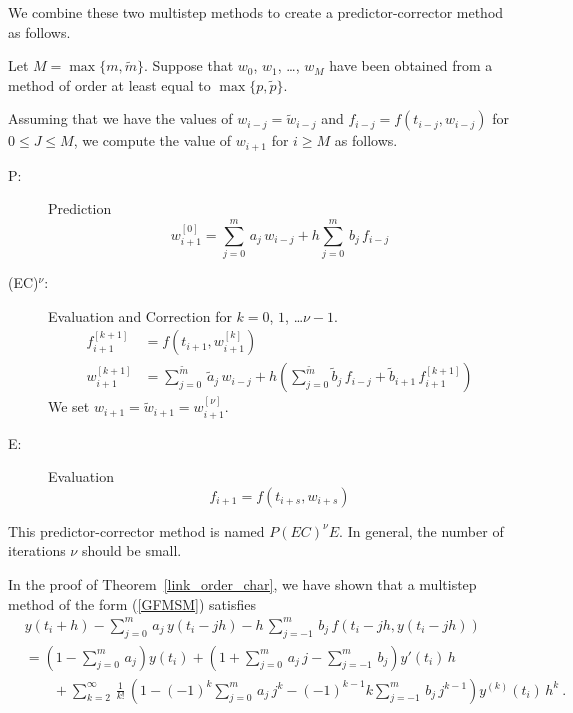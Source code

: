 We combine these two multistep methods to create a predictor-corrector
method as follows.

Let $M = \max\{m,\tilde{m}\}$.  Suppose that $w_0$, $w_1$, \ldots,
$w_M$ have been obtained from a method of order at least equal to
$\max\{p,\tilde{p}\}$.

Assuming that we have the values of $w_{i-j} = \tilde{w}_{i-j}$ and
$f_{i-j} = f(t_{i-j},w_{i-j})$ for $0\leq J \leq M$, we compute the value of
$w_{i+1}$ for $i\geq M$ as
follows.
\begin{description}
\item[P:] Prediction
\begin{equation} \label{Pred0}
w_{i+1}^{[0]} = \sum_{j=0}^m\,a_j\,w_{i-j} + h \sum_{j=0}^m\,b_j\,f_{i-j}
\end{equation}
\item[(EC)$^{\nu}$:] Evaluation and Correction for $k=0$, $1$, \ldots $\nu-1$.
\begin{align}
f_{i+1}^{[k+1]} &= f(t_{i+1},w_{i+1}^{[k]}) \nonumber \\
w_{i+1}^{[k+1]} &= \sum_{j=0}^{\tilde{m}}\,\tilde{a}_j\,w_{i-j} + h\left(
\sum_{j=0}^{\tilde{m}} \tilde{b}_j\,f_{i-j} + \tilde{b}_{i+1}\,f^{[k+1]}_{i+1}
\right)\label{Corr0}
\end{align}
We set $w_{i+1} = \tilde{w}_{i+1} = w_{i+1}^{[\nu]}$.
\item[E:] Evaluation
\[
f_{i+1} = f(t_{i+s},w_{i+s})
\]
\end{description}
This predictor-corrector method is named $P(EC)^{\nu}E$.  In general,
the number of iterations $\nu$ should be small.

In the proof of Theorem~\ref{link_order_char}, we have shown that a
multistep method of the form (\ref{GFMSM}) satisfies
\begin{equation}\label{GMSMdev}
\begin{split}
& y(t_i+h) - \sum_{j=0}^m\,a_j\,y(t_i-jh)
-h\,\sum_{j=-1}^m\,b_j\,f(t_i-jh,y(t_i-jh)) \\
&= \left( 1 - \sum_{j=0}^m\,a_j \right) y(t_i)
+ \left( 1 + \sum_{j=0}^m\,a_j\,j - \sum_{j=-1}^m\,b_j\right) y'(t_i)\,h \\
&\qquad
+ \sum_{k=2}^\infty\,\frac{1}{k!}\,\left( 1 - (-1)^k \sum_{j=0}^m\,a_j\,j^k
- (-1)^{k-1} k \sum_{j=-1}^m\,b_j\, j^{k-1}\right) y^{(k)}(t_i)\,h^k \ .
\end{split}
\end{equation}

